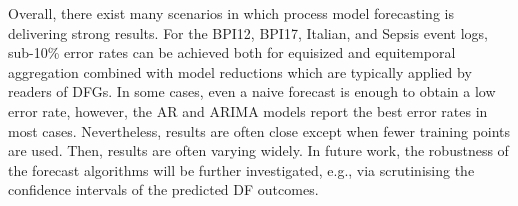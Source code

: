 Overall, there exist many scenarios in which process model forecasting is delivering strong results.
For the BPI12, BPI17, Italian, and Sepsis event logs, sub-10\% error rates can be achieved both for equisized and equitemporal aggregation combined with model reductions which are typically applied by readers of DFGs.
In some cases, even a naive forecast is enough to obtain a low error rate, however, the AR and ARIMA models report the best error rates in most cases.
Nevertheless, results are often close except when fewer training points are used.
Then, results are often varying widely.
In future work, the robustness of the forecast algorithms will be further investigated, e.g., via scrutinising the confidence intervals of the predicted DF outcomes.











